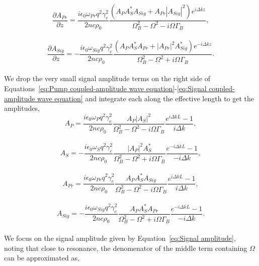 \\
\begin{equation}
    \frac{\partial A_{Pr}}{\partial z} = \frac{i\epsilon_{0}\omega_{Pr} q^{2}\gamma_{e}^{2}}{2nc\rho_{0}}\frac{(A_{P}A_{S}^{*}A_{Sig} + A_{Pr}|A_{Sig}|^{2})e^{i\Delta kz}}{\Omega_{B}^{2} - \Omega^{2} - i\Omega\Gamma_{B}},
\end{equation}
\\
\begin{equation}
    \frac{\partial A_{Sig}}{\partial z} = -\frac{i\epsilon_{0}\omega_{Sig} q^{2}\gamma_{e}^{2}}{2nc\rho_{0}}\frac{(A_{P}A_{S}^{*}A_{Pr} + |A_{Pr}|^{2}A_{Sig}^{*})e^{-i\Delta kz}}{\Omega_{B}^{2} - \Omega^{2} + i\Omega\Gamma_{B}}.
    \label{eq:Signal coupled-amplitude wave equation}
\end{equation}
\\
We drop the very small signal amplitude terms on the right side of Equations~\ref{eq:Pump coupled-amplitude wave equation}-\ref{eq:Signal coupled-amplitude wave equation} and integrate each along the effective length to get the amplitudes,
\\
\begin{equation}
  A_{P} = \frac{i\epsilon_{0}\omega_{P}q^{2}\gamma_{e}^{2}}{2nc\rho_{0}}\frac{A_{P}|A_{S}|^{2}}{\Omega_{B}^{2} - \Omega^{2} - i\Omega\Gamma_{B}} \frac{e^{i\Delta kL} - 1}{i\Delta k},
\end{equation}
\\
\begin{equation}
  A_{S} = -\frac{i\epsilon_{0}\omega_{S}q^{2}\gamma_{e}^{2}}{2nc\rho_{0}}\frac{|A_{P}|^{2}A_{S}^{*}}{\Omega_{B}^{2} - \Omega^{2} + i\Omega\Gamma_{B}} \frac{e^{-i\Delta kL} - 1}{-i\Delta k},
\end{equation}
\\
\begin{equation}
  A_{Pr} = \frac{i\epsilon_{0}\omega_{Pr}q^{2}\gamma_{e}^{2}}{2nc\rho_{0}}\frac{A_{P}A_{S}^{*}A_{Sig}}{\Omega_{B}^{2} - \Omega^{2} - i\Omega\Gamma_{B}} \frac{e^{i\Delta kL} - 1}{i\Delta k},
\end{equation}
\\
\begin{equation}
  A_{Sig} = -\frac{i\epsilon_{0}\omega_{Sig}q^{2}\gamma_{e}^{2}}{2nc\rho_{0}}\frac{A_{P}A_{S}^{*}A_{Pr}}{\Omega_{B}^{2} - \Omega^{2} + i\Omega\Gamma_{B}} \frac{e^{-i\Delta kL} - 1}{-i\Delta k}.
  \label{eq:Signal amplitude}
\end{equation}
\\
We focus on the signal amplitude given by Equation~\ref{eq:Signal amplitude}, noting that close to resonance, the denomenator of the middle term containing \(\Omega\) can be approximated as,
